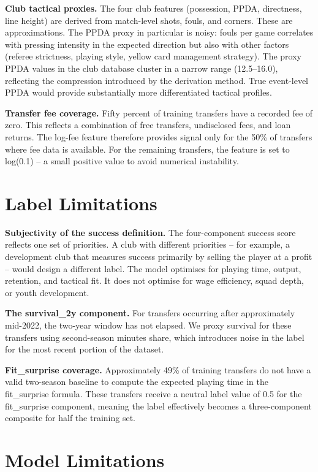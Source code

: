\documentclass[12pt, a4paper, oneside]{report}
\begin{document}
\textbf{Club tactical proxies.} The four club features (possession, PPDA, directness, line height) are derived from match-level shots, fouls, and corners. These are approximations. The PPDA proxy in particular is noisy: fouls per game correlates with pressing intensity in the expected direction but also with other factors (referee strictness, playing style, yellow card management strategy). The proxy PPDA values in the club database cluster in a narrow range (12.5--16.0), reflecting the compression introduced by the derivation method. True event-level PPDA would provide substantially more differentiated tactical profiles.

\textbf{Transfer fee coverage.} Fifty percent of training transfers have a recorded fee of zero. This reflects a combination of free transfers, undisclosed fees, and loan returns. The log-fee feature therefore provides signal only for the 50\% of transfers where fee data is available. For the remaining transfers, the feature is set to log(0.1) -- a small positive value to avoid numerical instability.

\section{Label Limitations}

\textbf{Subjectivity of the success definition.} The four-component success score reflects one set of priorities. A club with different priorities -- for example, a development club that measures success primarily by selling the player at a profit -- would design a different label. The model optimises for playing time, output, retention, and tactical fit. It does not optimise for wage efficiency, squad depth, or youth development.

\textbf{The survival\_2y component.} For transfers occurring after approximately mid-2022, the two-year window has not elapsed. We proxy survival for these transfers using second-season minutes share, which introduces noise in the label for the most recent portion of the dataset.

\textbf{Fit\_surprise coverage.} Approximately 49\% of training transfers do not have a valid two-season baseline to compute the expected playing time in the fit\_surprise formula. These transfers receive a neutral label value of 0.5 for the fit\_surprise component, meaning the label effectively becomes a three-component composite for half the training set.

\section{Model Limitations}
\end{document}
